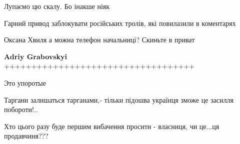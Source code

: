\begin{itemize}
Лупаємо цю скалу. Бо інакше ніяк

 
Гарний привод заблокувати російських тролів, які повилазили в коментарях

 
Оксана Хвиля а можна телефон начальниці? Скиньте в приват

\begin{itemize}
 
\textbf{Adriy Grabovskyi} +++++++++++++++++++++++++++++++++++
\end{itemize}

 
Это упоротые

 
Таргани залишаться тарганами,- тільки підошва українця зможе це засилля побороти!..

 
Хто цього разу буде першим вибачення просити - власниця, чи це...ця продавчиня???


\end{itemize}
